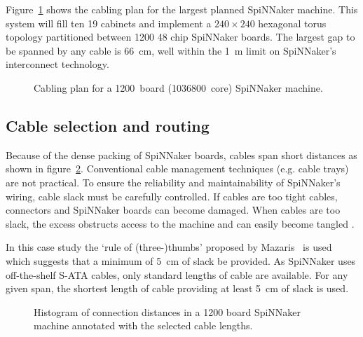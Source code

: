 			Figure~\ref{fig:million-core-machine} shows the cabling plan for the
			largest planned SpiNNaker machine. This system will fill ten 19\inch{}
			cabinets and implement a $240 \times 240$ hexagonal torus topology
			partitioned between \num{1200} 48 chip SpiNNaker boards. The largest gap
			to be spanned by any cable is \SI{66}{\centi\meter}, well within the
			\SI{1}{\meter} limit on SpiNNaker's interconnect technology.
			
			\begin{figure}
				\center
				
				\caption[Cabling plan for a \num{1200}~board SpiNNaker machine.]%
				{Cabling plan for a \num{1200}~board (\num{1036800}~core)
				SpiNNaker machine.}
				\label{fig:million-core-machine}
			\end{figure}
			
		\subsection{Cable selection and routing}
			
			Because of the dense packing of SpiNNaker boards, cables span short
			distances as shown in figure~\ref{fig:wire-length-histogram}.
			Conventional cable management techniques (e.g. cable trays) are not
			practical. To ensure the reliability and maintainability of SpiNNaker's
			wiring, cable slack must be carefully controlled.  If cables are too
			tight cables, connectors and SpiNNaker boards can become damaged. When
			cables are too slack, the excess obstructs access to the machine and can
			easily become tangled \cite{cisco07}.
			
			In this case study the `rule of (three-)thumbs' proposed by
			Mazaris~\cite{mazaris97} is used which suggests that a minimum of
			\SI{5}{\centi\meter} of slack be provided. As SpiNNaker uses
			off-the-shelf S-ATA cables, only standard lengths of cable are available.
			For any given span, the shortest length of cable providing at least
			\SI{5}{\centi\meter} of slack is used.
			
			\begin{figure}
				
				\center
				
				\caption[Cable lengths in a \num{1200}~board SpiNNaker machine.]%
				{Histogram of connection distances in a \num{1200} board SpiNNaker
				machine annotated with the selected cable lengths.}
				\label{fig:wire-length-histogram}
				
			\end{figure}
		

